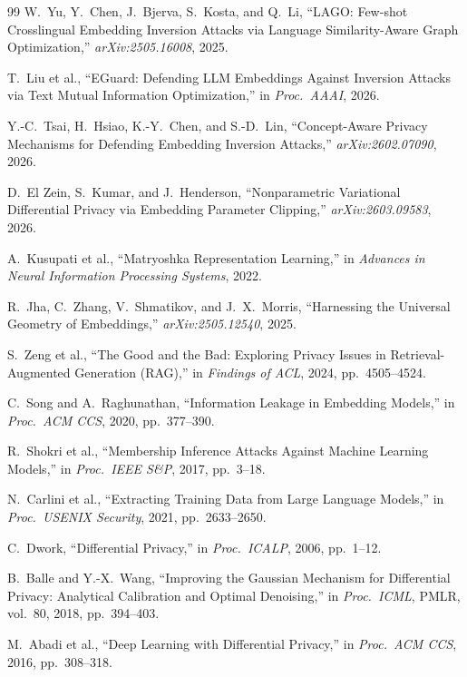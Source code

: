 \documentclass[11pt,a4paper]{article}
\begin{document}
\begin{thebibliography}{99}
 W.\ Yu, Y.\ Chen, J.\ Bjerva, S.\ Kosta, and Q.\ Li,
``LAGO: Few-shot Crosslingual
Embedding Inversion Attacks via Language Similarity-Aware Graph
Optimization,'' \emph{arXiv:2505.16008}, 2025.

 T.\ Liu et al., ``EGuard: Defending LLM Embeddings
Against Inversion Attacks via Text Mutual Information Optimization,''
in \emph{Proc.\ AAAI}, 2026.

 Y.-C.\ Tsai, H.\ Hsiao, K.-Y.\ Chen, and S.-D.\
Lin, ``Concept-Aware Privacy Mechanisms for Defending Embedding
Inversion Attacks,'' \emph{arXiv:2602.07090}, 2026.

 D.\ El Zein, S.\ Kumar, and J.\ Henderson,
``Nonparametric Variational Differential Privacy via Embedding Parameter
Clipping,'' \emph{arXiv:2603.09583}, 2026.

 A.\ Kusupati et al., ``Matryoshka Representation
Learning,'' in \emph{Advances in Neural Information Processing Systems},
2022.

 R.\ Jha, C.\ Zhang, V.\ Shmatikov, and J.\ X.\
Morris, ``Harnessing the Universal Geometry of Embeddings,''
\emph{arXiv:2505.12540}, 2025.

 S.\ Zeng et al., ``The Good and the Bad:
Exploring Privacy Issues in Retrieval-Augmented Generation (RAG),''
in \emph{Findings of ACL}, 2024, pp.\ 4505--4524.

 C.\ Song and A.\ Raghunathan, ``Information
Leakage in Embedding Models,'' in \emph{Proc.\ ACM CCS}, 2020,
pp.\ 377--390.

 R.\ Shokri et al., ``Membership Inference Attacks
Against Machine Learning Models,'' in \emph{Proc.\ IEEE S\&P},
2017, pp.\ 3--18.

 N.\ Carlini et al., ``Extracting Training Data
from Large Language Models,'' in \emph{Proc.\ USENIX Security},
2021, pp.\ 2633--2650.

 C.\ Dwork, ``Differential Privacy,'' in
\emph{Proc.\ ICALP}, 2006, pp.\ 1--12.

 B.\ Balle and Y.-X.\ Wang,
``Improving the Gaussian Mechanism for Differential Privacy: Analytical
Calibration and Optimal Denoising,'' in \emph{Proc.\ ICML}, PMLR, vol.\ 80,
2018, pp.\ 394--403.

 M.\ Abadi et al., ``Deep Learning with Differential
Privacy,'' in \emph{Proc.\ ACM CCS}, 2016, pp.\ 308--318.


\end{thebibliography}
\end{document}
